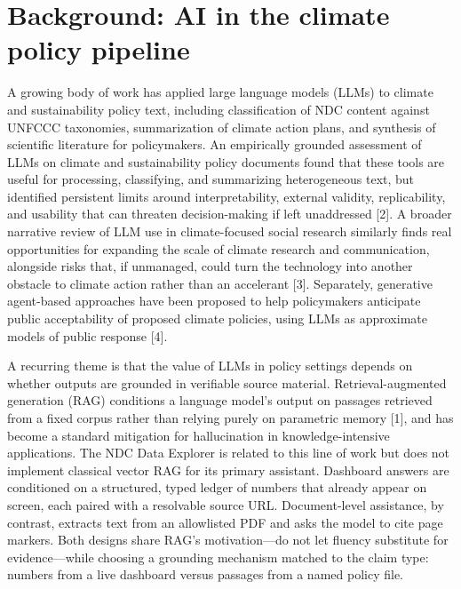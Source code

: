\documentclass{article}
\begin{document}
\section{Background: AI in the climate policy pipeline}
\label{sec:background}

A growing body of work has applied large language models (LLMs) to climate and sustainability policy text, including classification of NDC content against UNFCCC taxonomies, summarization of climate action plans, and synthesis of scientific literature for policymakers. An empirically grounded assessment of LLMs on climate and sustainability policy documents found that these tools are useful for processing, classifying, and summarizing heterogeneous text, but identified persistent limits around interpretability, external validity, replicability, and usability that can threaten decision-making if left unaddressed [2]. A broader narrative review of LLM use in climate-focused social research similarly finds real opportunities for expanding the scale of climate research and communication, alongside risks that, if unmanaged, could turn the technology into another obstacle to climate action rather than an accelerant [3]. Separately, generative agent-based approaches have been proposed to help policymakers anticipate public acceptability of proposed climate policies, using LLMs as approximate models of public response [4].

A recurring theme is that the value of LLMs in policy settings depends on whether outputs are grounded in verifiable source material. Retrieval-augmented generation (RAG) conditions a language model's output on passages retrieved from a fixed corpus rather than relying purely on parametric memory [1], and has become a standard mitigation for hallucination in knowledge-intensive applications. The NDC Data Explorer is related to this line of work but does not implement classical vector RAG for its primary assistant. Dashboard answers are conditioned on a structured, typed ledger of numbers that already appear on screen, each paired with a resolvable source URL. Document-level assistance, by contrast, extracts text from an allowlisted PDF and asks the model to cite page markers. Both designs share RAG's motivation---do not let fluency substitute for evidence---while choosing a grounding mechanism matched to the claim type: numbers from a live dashboard versus passages from a named policy file.
\end{document}
